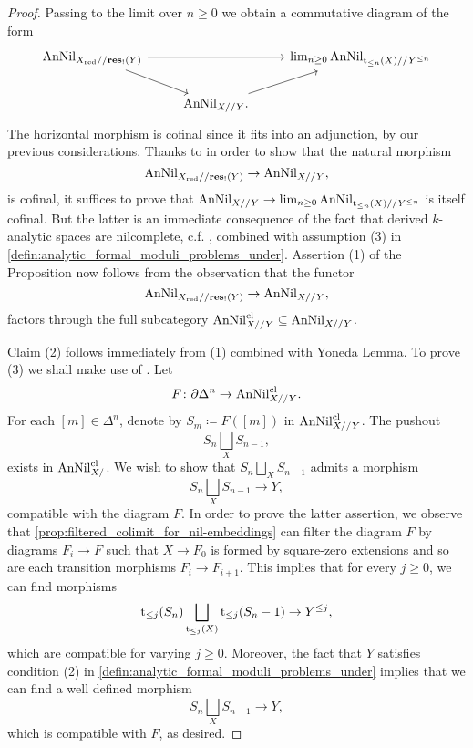 \documentclass[10pt,a4paper,reqno]{amsart} %
\theoremstyle{plain}
\theoremstyle{definition}
\theoremstyle{remark}
\numberwithin{equation}{section}
\begin{document}
\begin{proof}
    Passing to the limit over $n \ge 0$ we obtain a commutative diagram of the form
        \[
        \begin{tikzcd}
            \anNil_{X_\red/ /\mathbf{res}_!(Y)} \ar{rr} \ar{rd} & & \lim_{n \ge 0} \anNil_{\rt_{\le n}(X)/ /Y^{\le n}} \\
                                                & \anNil_{X/ /Y} \ar{ur}.
        \end{tikzcd}
        \]  
    The horizontal morphism is cofinal since it fits into an adjunction, by our previous considerations. Thanks to \cite[
        Corollary 4.1.1.9]{HTT} in order to show that the natural morphism
        \[
            \mathrm{AnNil}_{X_{\mathrm{red}}/ /\mathbf{res}_!(Y)} \to \mathrm{AnNil}_{X/ /Y},
        \]
    is cofinal, it suffices to prove that $\mathrm{AnNil}_{X/ /Y} \to \lim_{n \ge 0} \mathrm{AnNil}_{\mathrm t_{\le n}(X)/ /Y^{\le n}}$ is itself cofinal. But the latter is an immediate consequence of
    the fact that derived $k$-analytic spaces are nilcomplete, c.f. \cite[Lemma 7.7]{Porta_Yu_Representability}, combined with assumption (3) in \cref{defin:analytic_formal_moduli_problems_under}.
    Assertion (1) of the Proposition now follows from the observation that the functor
        \[
            \mathrm{AnNil}_{X_{\mathrm{red}}/ /\mathbf{res}_!(Y)} \to \mathrm{AnNil}_{X/ /Y},
        \]
    factors through the full subcategory $\mathrm{AnNil}_{X/ /Y}^{\mathrm{cl}} \subseteq \mathrm{AnNil}_{X/ /Y}$.
    
    Claim (2) follows immediately from (1) combined with Yoneda Lemma. To prove (3) we shall make use of \cite[Lemma 5.3.1.12]{HTT}. Let
        \[
            F \colon \partial \Delta^n \to \mathrm{AnNil}^{\mathrm{cl}}_{X//Y}.  
        \]
    For each $[m] \in \Delta^{n}$, denote by $S_m \coloneqq F([m]) $ in $\mathrm{AnNil}^{\mathrm{cl}}_{X//Y}$. The pushout
        \[
            S_n \bigsqcup_X S_{n-1},  
        \]
    exists in $\mathrm{AnNil}^{\mathrm{cl}}_{X/}$. We wish to show that $S_n \bigsqcup_X S_{n-1}$ admits a morphism
        \[S_n \bigsqcup_X S_{n-1} \to Y,\]
    compatible with the diagram $F$. In order to prove the latter assertion, we observe that \cref{prop:filtered_colimit_for_nil-embeddings} can filter the diagram $F$ by diagrams $F_i \to F$ such that $X \to F_0$ is formed by square-zero
    extensions and so are each transition morphisms $F_i \to F_{i+1}$. This implies that for every $j \ge 0$, we can find morphisms
        \[
            \mathrm t_{\le j}(S_n) \bigsqcup_{\mathrm t_{\le j}(X)} \mathrm t_{\le j}(S_n-1) \to Y^{\le j}, 
        \]
    which are compatible for varying $j \ge 0$.
    Moreover, the fact that $Y$ satisfies condition (2) in \cref{defin:analytic_formal_moduli_problems_under}
    implies that we can find a well defined morphism
        \[
            S_n \bigsqcup_X S_{n-1} \to Y,  
        \]
    which is compatible with $F$, as desired.
\end{proof}
\end{document}
